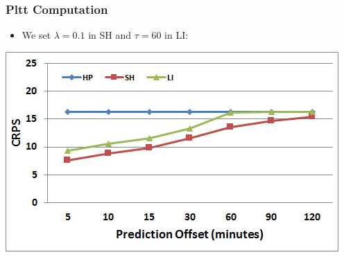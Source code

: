 \documentclass[t]{beamer}
\begin{document}


\begin{frame}\frametitle{Pltt Computation}
\begin{itemize}
\item We set $\lambda = 0.1$ in SH and $\tau = 60$ in LI:
\end{itemize}
\begin{center}
	\includegraphics[scale=0.5]{Links_Best.jpg}
\end{center}
\end{frame}
\end{document}
